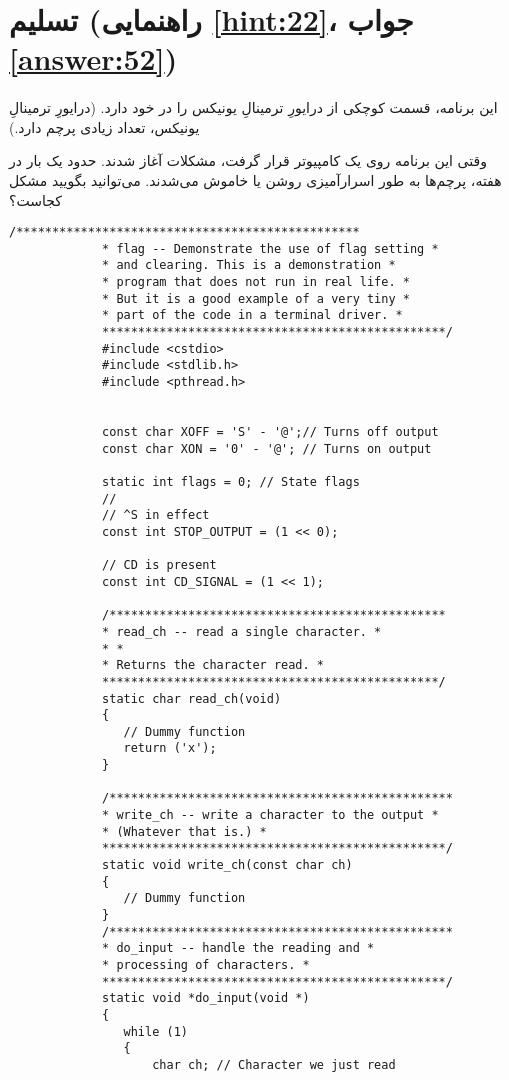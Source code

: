 \section[تسلیم]{تسلیم \protect{} (راهنمایی \ref{hint:22}، جواب \ref{answer:52})}
\paragraph{}\label{prog:113}
این برنامه، قسمت کوچکی از درایورِ ترمینالِ یونیکس را در خود دارد. (درایورِ ترمینالِ یونیکس، تعداد زیادی پرچم دارد.)

وقتی این برنامه روی یک کامپیوتر  قرار گرفت، مشکلات آغاز شدند. حدود یک بار در هفته، پرچم‌ها به طور اسرارآمیزی روشن یا خاموش می‌شدند. می‌توانید بگویید مشکل کجاست؟

\begin{LTR}
        \begin{lstlisting}[style=C++Style]
             /************************************************
             * flag -- Demonstrate the use of flag setting *
             * and clearing. This is a demonstration *
             * program that does not run in real life. *
             * But it is a good example of a very tiny *
             * part of the code in a terminal driver. *
             ************************************************/
             #include <cstdio>
             #include <stdlib.h>
             #include <pthread.h>


             const char XOFF = 'S' - '@';// Turns off output
             const char XON = '0' - '@'; // Turns on output

             static int flags = 0; // State flags
             //
             // ^S in effect
             const int STOP_OUTPUT = (1 << 0);

             // CD is present
             const int CD_SIGNAL = (1 << 1);

             /***********************************************
             * read_ch -- read a single character. *
             * *
             * Returns the character read. *
             ***********************************************/
             static char read_ch(void)
             {
             	// Dummy function
             	return ('x');
             }

             /************************************************
             * write_ch -- write a character to the output *
             * (Whatever that is.) *
             ************************************************/
             static void write_ch(const char ch)
             {
             	// Dummy function
             }
             /************************************************
             * do_input -- handle the reading and *
             * processing of characters. *
             ************************************************/
             static void *do_input(void *)
             {
             	while (1)
             	{
             		char ch; // Character we just read


\end{lstlisting}
\end{LTR}
